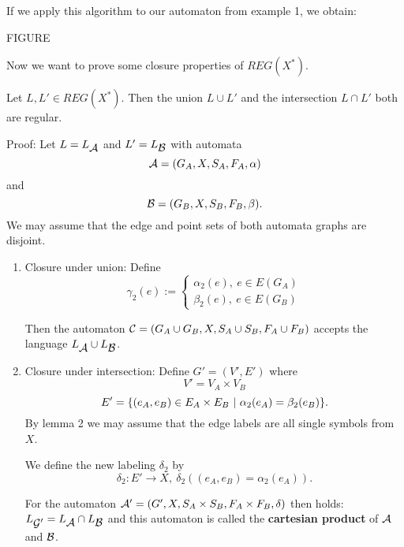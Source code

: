 If we apply this algorithm to our automaton from example 1, we obtain:

FIGURE

Now we want to prove some closure properties of $REG(X^*)$.

\begin{theorem}
Let $L, L' \in REG(X^*)$. Then the union $L \cup L'$ and the intersection $L
\cap L'$ both are regular.
\end{theorem}

Proof: Let $L = \mbox{$L_{\mbox{$\mathcal{A}$}}$}$ and $L' = \mbox{$L_{\mbox{$\mathcal{B}$}}$}$ with automata \[
\mbox{$\mathcal{A}$} = (G_A, X, S_A, F_A, \alpha) \] and \[ \mbox{$\mathcal{B}$} = (G_B, X, S_B,
F_B, \beta).\]
We may assume that the edge and point sets of both automata graphs are disjoint.

\begin{enumerate}
  \item Closure under union: Define
	\[ \gamma_2(e) := \left\{
		\begin{array}{l} 
		\alpha_2(e),\ e \in E(G_A) \\
		\beta_2(e),\ e \in E(G_B)
		\end{array}
	 \right. \]

	Then the automaton $\mbox{$\mathcal{C}$} = (G_A \cup G_B, X, S_A \cup S_B, F_A \cup F_B)$
	accepts the language $\mbox{$L_{\mbox{$\mathcal{A}$}}$} \cup \mbox{$L_{\mbox{$\mathcal{B}$}}$}$.
	
	\item Closure under intersection: Define $G' = (V', E')$ where
	\[ V' = V_A \times V_B \]
	\[ E' = \{ (e_A, e_B) \in E_A \times E_B \ |\  \alpha_2(e_A) = \beta_2(e_B)
		 \}. \]
	By lemma 2 we may assume that the edge labels are all single symbols from $X$.
	
	We define the new labeling $\delta_2$ by \[ \delta_2 : E' \to X,\
	\delta_2((e_A, e_B) = \alpha_2(e_A)). \]
	
	For the automaton $\mbox{$\mathcal{A'}$} = (G', X, S_A \times S_B, F_A \times F_B,
	\delta)$ then holds: $\mbox{$L_{\mbox{$\mathcal{G'}$}}$} = \mbox{$L_{\mbox{$\mathcal{A}$}}$} \cap \mbox{$L_{\mbox{$\mathcal{B}$}}$}$
	and this automaton is called the {\bf cartesian product} of $\mbox{$\mathcal{A}$}$ and
	$\mbox{$\mathcal{B}$}$.
\end{enumerate}










































